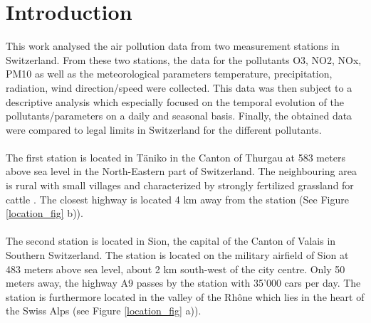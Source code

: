 \documentclass[a4paper, 12pt]{article}
\begin{document}

\newpage
\tableofcontents
{}
\newpage
{}
\setcounter{page}{1}


\section{Introduction}

    This work analysed the air pollution data from two measurement stations in Switzerland. From these two stations, the data for the pollutants O3, NO2, NOx, PM10 as well as the meteorological parameters temperature, precipitation, radiation, wind direction/speed were collected. This data was then subject to a descriptive analysis which especially focused on the temporal evolution of the pollutants/parameters on a daily and seasonal basis. Finally, the obtained data were compared to legal limits in Switzerland for the different pollutants.
    \\
    \\
    The first station is located in Täniko in the Canton of Thurgau at 583 meters above sea level in the North-Eastern part of Switzerland. The neighbouring area is rural with small villages and characterized by strongly fertilized grassland for cattle . The closest highway is located 4 km away from the station (See Figure \ref{location_fig} b)).  
    \\
    \\
    The second station is located in Sion, the capital of the Canton of Valais in Southern Switzerland. The station is located on the military airfield of Sion at 483 meters above sea level, about 2 km south-west of the city centre. Only 50 meters away, the highway A9 passes by the station with 35’000 cars per day. The station is furthermore located in the valley of the Rhône which lies in the heart of the Swiss Alps (see Figure \ref{location_fig} a)). 
    
\end{document}
